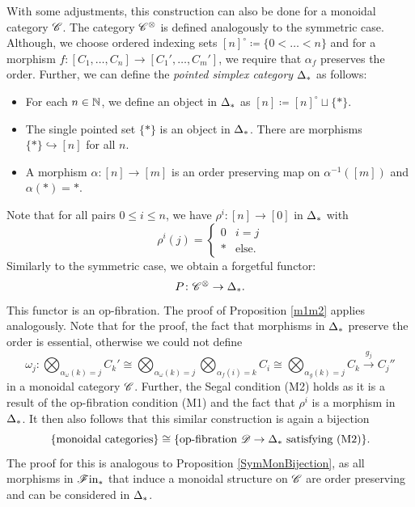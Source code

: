 \begin{rem}
    With some adjustments, this construction can also be done for a monoidal
    category $\mathscr{C}$. The category $\mathscr{C}^{\otimes}$ is defined analogously to the
    symmetric case. Although, we choose ordered indexing sets $[n]^{\circ}
    \coloneqq \{0 < \dots < n\}$ and for a morphism $f \colon [C_1, \dots, C_n]
    \to [C_1', \dots, C_m']$, we require that $\alpha_f$ preserves the order.
    Further, we can define the {\em pointed simplex category} $\Delta_{\ast}$ as
    follows:
    \begin{itemize}
        \item For each $n \in \mathbb{N}$, we define an object in $\Delta_{\ast}$ as $[n]
        \coloneqq [n]^{\circ} \sqcup \{\ast\}$.
        \item The single pointed set $\{ \ast \}$ is an object in $\Delta_{\ast}$.
        There are morphisms $\{\ast\} \hookrightarrow [n]$ for all $n$.
        \item A morphism $\alpha \colon [n] \to [m]$ is an order preserving map
        on $\alpha^{-1}([m])$ and $\alpha(\ast) = \ast$.
    \end{itemize}
    Note that for all pairs $0 \leq i \leq n$, we have $\rho^i \colon [n] \to
    [0]$ in $\Delta_{\ast}$ with
    \[
        \rho^i(j) = \begin{cases}
            0 & i = j \\
            \ast & \text{else.}
        \end{cases}
    \]
    Similarly to the symmetric case, we obtain a forgetful functor:
    \[
        P \colon \mathscr{C}^{\otimes} \to \Delta_{\ast}.
    \]
    This functor is an op-fibration. The proof of Proposition \ref{m1m2} applies
    analogously. Note that for the proof, the fact that morphisms in $\Delta_{\ast}$
    preserve the order is essential, otherwise we could not define
    \[
             \omega_j \colon \bigotimes_{\alpha_{\omega}(k)=j} C_k' \cong \bigotimes_{\alpha_{\omega}(k)=j} \bigotimes_{\alpha_f(i)=k} C_i \cong \bigotimes_{\alpha_g(k)=j} C_k \xrightarrow{g_j} C_j''
            \]
    in a monoidal category $\mathscr{C}$. Further, the Segal condition (M2) holds as it
    is a result of the op-fibration condition (M1) and the fact that $\rho^i$ is
    a morphism in $\Delta_{\ast}$. It then also follows that this similar
    construction is again a bijection
    \[
    \{\text{monoidal categories}\} \cong \{\text{op-fibration } \mathscr{D} \to \Delta_{\ast} \text{ satisfying (M2)}\}.
    \]
    The proof for this is analogous to Proposition \ref{SymMonBijection}, as all
    morphisms in $\mathscr{F} \text{in}_{\ast}$ that induce a monoidal structure on $\mathscr{C}$ are order
    preserving and can be considered in $\Delta_{\ast}$.
\end{rem}

